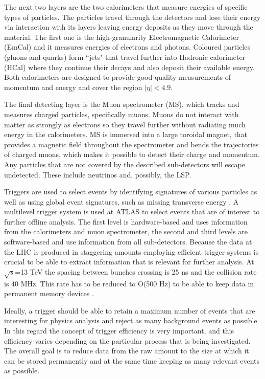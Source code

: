 The next two layers are the two calorimeters that measure energies of specific types of particles. The particles travel through the detectors and lose their energy via interaction with its layers leaving energy deposits as they move through the material. 
The first one is the high-granularity Electromagnetic Calorimeter (EmCal) and it measures energies of electrons and photons. Coloured particles (gluons and quarks) form ``jets" that travel further into Hadronic calorimeter (HCal) where they continue their decays and also deposit their available energy.
Both calorimeters are  designed to provide good quality measurements of momentum and energy and cover the region $|\eta|<4.9$.

The final detecting layer is the Muon spectrometer (MS), which tracks and measures charged particles, specifically muons. Muons do not interact with matter as strongly as electrons so they travel further without radiating much energy in the calorimeters.
MS is immersed into a large toroidal magnet, that provides a magnetic field throughout the spectrometer and bends the trajectories of charged muons, which makes it possible to detect their charge and momentum. Any particles that are not covered by the described sub-detectors will escape undetected. These include neutrinos and, possibly, the LSP. 

Triggers are used to select events by identifying signatures of various particles as well as using global event signatures, such as missing transverse energy \citep{aad2012performance}. A multilevel trigger system is used at ATLAS to select events that are of interest to further offline analysis. 
The  first  level is hardware-based and uses information from the calorimeters and muon spectrometer, the second and third levels are software-based and use information from all sub-detectors. Because the data at the LHC is produced in staggering amounts employing efficient trigger systems is crucial to be able to extract information that is relevant for further analysis. At $\sqrt{s}$=13 TeV the spacing between bunches crossing is 25 ns and the collision rate is 40 MHz. This rate has to be reduced to O(500 Hz) to be able to keep data in permanent memory devices \citep{barr2015particle}.

Ideally, a trigger should be able to retain a maximum number of events that are interesting for physics analysis and reject as many background events as possible. In this regard the concept of trigger efficiency is very important, and this efficiency varies depending on the particular process that is being investigated. The overall goal is to reduce data from the raw amount to the size at which it can be stored permanently and at the same time keeping  as many relevant events as possible. 
